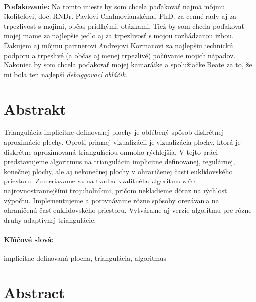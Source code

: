 \documentclass[12pt, twoside]{book}
\begin{document}

\frontmatter

\setcounter{page}{3}
\newpage 
~

\vfill
{\bf Poďakovanie:} Na tomto mieste by som chcela poďakovať najmä môjmu školiteľovi,
doc. RNDr. Pavlovi Chalmovianskému, PhD. za cenné rady aj za trpezlivosť s mojimi, 
občas pridlhými, otázkami. Tiež by som chcela poďakovať mojej mame za najlepšie 
jedlo aj za trpezlivosť s mojou rozhádzanou izbou. Ďakujem aj môjmu partnerovi Andrejovi 
Kormanovi za najlepšiu technickú podporu a trpezlivé (a občas aj menej trpezlivé) 
počúvanie mojich nápadov. Nakoniec by som chcela poďakovať mojej kamarátke a spolužiačke
Beate za to, že mi bola ten najlepší \textit{debuggovací obláčik}.


\newpage 
\section*{Abstrakt}

Triangulácia implicitne definovanej plochy je obľúbený spôsob diskrétnej aproximácie
plochy. Oproti priamej vizualizácii je vizualizácia plochy, ktorá je diskrétne 
aproximovaná trianguláciou omnoho rýchlejšia.
V tejto práci predstavujeme algoritmus na trianguláciu implicitne definovanej, regulárnej,
konečnej plochy, ale aj nekonečnej plochy v ohraničenej časti euklidovského priestoru. 
Zameriavame sa na tvorbu kvalitného algoritmu s čo najrovnostrannejšími
trojuholníkmi, pričom nekladieme dôraz na rýchlosť výpočtu. Implementujeme a 
porovnávame rôzne spôsoby orezávania na ohraničenú časť euklidovského priestoru. 
Vytvárame aj verzie algoritmu pre rôzne druhy adaptívnej triangulácie. 

\paragraph*{Kľúčové slová:} implicitne definovaná plocha, triangulácia, algoritmus


\newpage 
\section*{Abstract}
\end{document}
